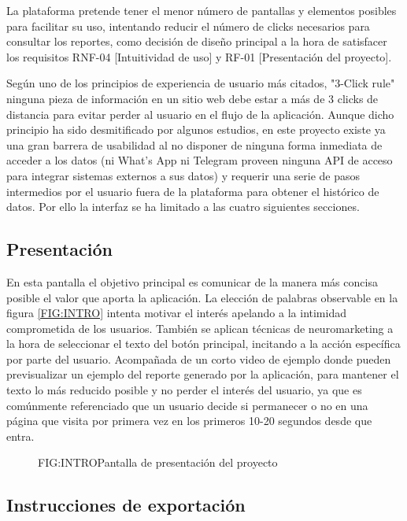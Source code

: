 
La plataforma pretende tener el menor número de pantallas y elementos posibles para facilitar su uso, intentando reducir el número de clicks necesarios para consultar los reportes, como decisión de diseño principal a la hora de satisfacer los requisitos RNF-04 [Intuitividad de uso] y RF-01 [Presentación del proyecto].

Según uno de los principios de experiencia de usuario más citados, "3-Click rule"\cite{3ClickRule} ninguna pieza de información en un sitio web debe estar a más de 3 clicks de distancia para evitar perder al usuario en el flujo de la aplicación. Aunque dicho principio ha sido desmitificado por algunos estudios\cite{3ClickRuleMyth}, en este proyecto existe ya una gran barrera de usabilidad al no disponer de ninguna forma inmediata de acceder a los datos (ni What's App ni Telegram proveen ninguna API de acceso para integrar sistemas externos a sus datos) y requerir una serie de pasos intermedios por el usuario fuera de la plataforma para obtener el histórico de datos. Por ello la interfaz se ha limitado a las cuatro siguientes secciones.

\subsection{Presentación}

En esta pantalla el objetivo principal es comunicar de la manera más concisa posible el valor que aporta la aplicación. La elección de palabras observable en la figura \ref{FIG:INTRO} intenta motivar el interés apelando a la intimidad comprometida de los usuarios. También se aplican técnicas de neuromarketing\cite{CallToAction} a la hora de seleccionar el texto del botón principal, incitando a la acción específica por parte del usuario. Acompañada de un corto video de ejemplo donde pueden previsualizar un ejemplo del reporte generado por la aplicación, para mantener el texto lo más reducido posible y no perder el interés del usuario, ya que es comúnmente referenciado que un usuario decide si permanecer o no en una página que visita por primera vez en los primeros 10-20 segundos desde que entra\cite{UserStay}.

\begin{figure}[Pantalla de presentación del proyecto]{FIG:INTRO}{Pantalla de presentación del proyecto}
\end{figure}

\subsection{Instrucciones de exportación}

